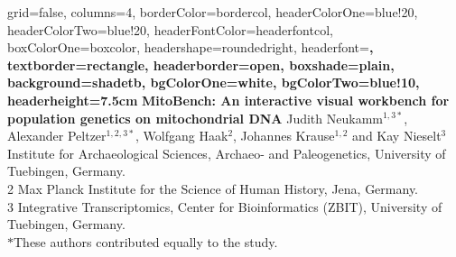 \documentclass[a0paper,portrait]{baposter}
\begin{document}


\begin{poster}{
	grid=false,
	columns=4,
	borderColor=bordercol,
	headerColorOne=blue!20,
	headerColorTwo=blue!20,
	headerFontColor=headerfontcol,
	boxColorOne=boxcolor,
	headershape=roundedright,
	headerfont=\Large\sf\bf,
	textborder=rectangle,
	headerborder=open,
  boxshade=plain,
	background=shadetb,
	bgColorOne=white,
	bgColorTwo=blue!10,
	headerheight=7.5cm
}
{
}
{\sf\bf
	MitoBench: An interactive visual workbench for population genetics on mitochondrial DNA
}
{
	\vspace{1em} Judith Neukamm$^{1,3*}$, Alexander Peltzer$^{1,2,3*}$, Wolfgang Haak$^{2}$, Johannes Krause$^{1,2}$ and Kay Nieselt$^{3}$\\
	\vspace{1em}
	{ Institute for Archaeological Sciences, Archaeo- and Paleogenetics, University of Tuebingen, Germany.\\
	2 Max Planck Institute for the Science of Human History, Jena, Germany.\\
	3 Integrative Transcriptomics, Center for Bioinformatics (ZBIT), University of Tuebingen, Germany.\\
	$*$These authors contributed equally to the study.
	}
}
{
}
\end{poster}
\end{document}
